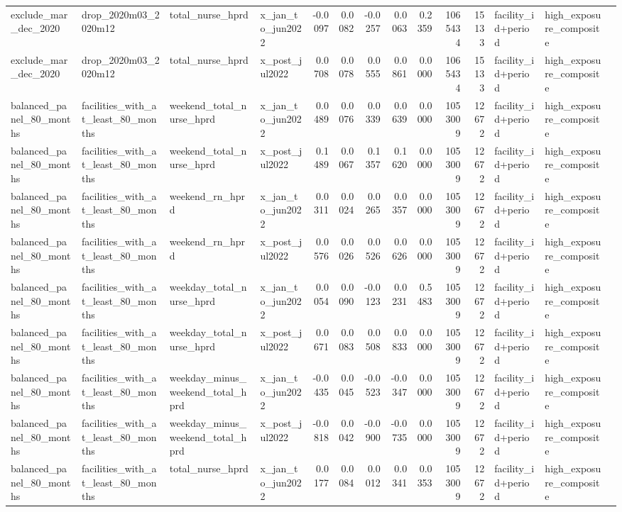 \begin{tabular}{llllrrrrrrrlll}
exclude_mar_dec_2020 & drop_2020m03_2020m12 & total_nurse_hprd & x_jan_to_jun2022 & -0.0097 & 0.0082 & -0.0257 & 0.0063 & 0.2359 & 1065434 & 15133 & facility_id+period & high_exposure_composite &  \\
exclude_mar_dec_2020 & drop_2020m03_2020m12 & total_nurse_hprd & x_post_jul2022 & 0.0708 & 0.0078 & 0.0555 & 0.0861 & 0.0000 & 1065434 & 15133 & facility_id+period & high_exposure_composite &  \\
balanced_panel_80_months & facilities_with_at_least_80_months & weekend_total_nurse_hprd & x_jan_to_jun2022 & 0.0489 & 0.0076 & 0.0339 & 0.0639 & 0.0000 & 1053009 & 12672 & facility_id+period & high_exposure_composite &  \\
balanced_panel_80_months & facilities_with_at_least_80_months & weekend_total_nurse_hprd & x_post_jul2022 & 0.1489 & 0.0067 & 0.1357 & 0.1620 & 0.0000 & 1053009 & 12672 & facility_id+period & high_exposure_composite &  \\
balanced_panel_80_months & facilities_with_at_least_80_months & weekend_rn_hprd & x_jan_to_jun2022 & 0.0311 & 0.0024 & 0.0265 & 0.0357 & 0.0000 & 1053009 & 12672 & facility_id+period & high_exposure_composite &  \\
balanced_panel_80_months & facilities_with_at_least_80_months & weekend_rn_hprd & x_post_jul2022 & 0.0576 & 0.0026 & 0.0526 & 0.0626 & 0.0000 & 1053009 & 12672 & facility_id+period & high_exposure_composite &  \\
balanced_panel_80_months & facilities_with_at_least_80_months & weekday_total_nurse_hprd & x_jan_to_jun2022 & 0.0054 & 0.0090 & -0.0123 & 0.0231 & 0.5483 & 1053009 & 12672 & facility_id+period & high_exposure_composite &  \\
balanced_panel_80_months & facilities_with_at_least_80_months & weekday_total_nurse_hprd & x_post_jul2022 & 0.0671 & 0.0083 & 0.0508 & 0.0833 & 0.0000 & 1053009 & 12672 & facility_id+period & high_exposure_composite &  \\
balanced_panel_80_months & facilities_with_at_least_80_months & weekday_minus_weekend_total_hprd & x_jan_to_jun2022 & -0.0435 & 0.0045 & -0.0523 & -0.0347 & 0.0000 & 1053009 & 12672 & facility_id+period & high_exposure_composite &  \\
balanced_panel_80_months & facilities_with_at_least_80_months & weekday_minus_weekend_total_hprd & x_post_jul2022 & -0.0818 & 0.0042 & -0.0900 & -0.0735 & 0.0000 & 1053009 & 12672 & facility_id+period & high_exposure_composite &  \\
balanced_panel_80_months & facilities_with_at_least_80_months & total_nurse_hprd & x_jan_to_jun2022 & 0.0177 & 0.0084 & 0.0012 & 0.0341 & 0.0353 & 1053009 & 12672 & facility_id+period & high_exposure_composite &  \\

\end{tabular}

